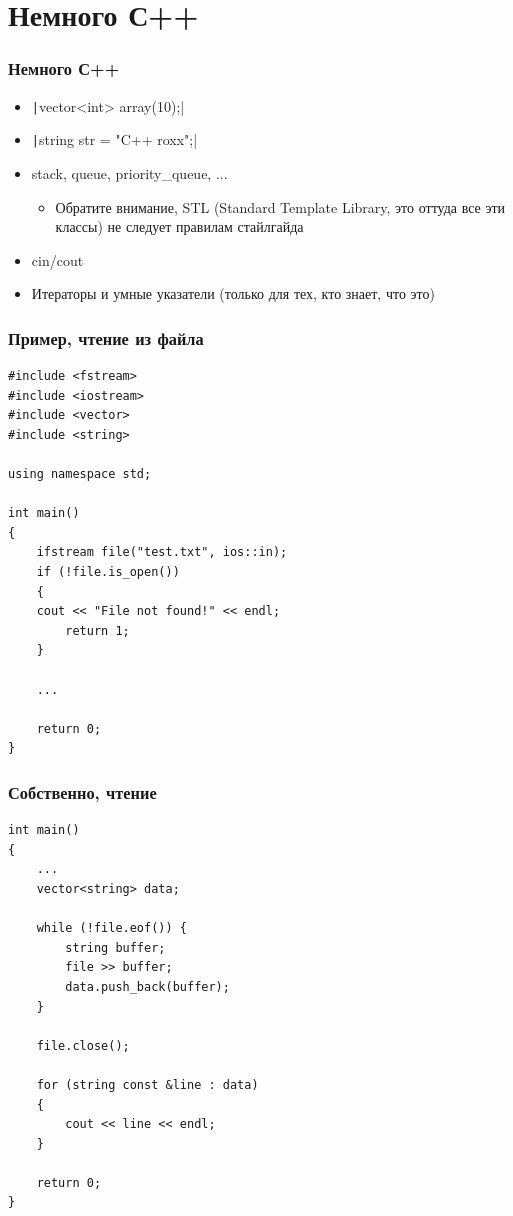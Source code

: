 \documentclass[xetex,mathserif,serif]{beamer}
\begin{document}
	\section{Немного С++}

	\begin{frame}
		\frametitle{Немного С++}
		\begin{itemize}
			\item \texttt|vector<int> array(10);|
			\item \texttt|string str = "C++ roxx";|
			\item stack, queue, priority\_queue, ...
			\begin{itemize}
				\item Обратите внимание, STL (Standard Template Library, это оттуда все эти классы) не следует правилам стайлгайда
			\end{itemize}
			\item cin/cout
			\item Итераторы и умные указатели (только для тех, кто знает, что это)
		\end{itemize}
	\end{frame}

	\begin{frame}[fragile]
		\frametitle{Пример, чтение из файла}
		\begin{scriptsize}
			\begin{verbatim}
#include <fstream>
#include <iostream>
#include <vector>
#include <string>

using namespace std;

int main()
{
    ifstream file("test.txt", ios::in);
    if (!file.is_open()) 
    {
    cout << "File not found!" << endl;
        return 1;
    }

    ...

    return 0;
}
			\end{verbatim}
		\end{scriptsize}
	\end{frame}

	\begin{frame}[fragile]
		\frametitle{Собственно, чтение}
		\begin{scriptsize}
			\begin{verbatim}
int main()
{
    ...
    vector<string> data;

    while (!file.eof()) {
        string buffer;
        file >> buffer;
        data.push_back(buffer);
    }

    file.close();

    for (string const &line : data) 
    {
        cout << line << endl;
    }

    return 0;
}
			\end{verbatim}
		\end{scriptsize}
	\end{frame}
\end{document}
